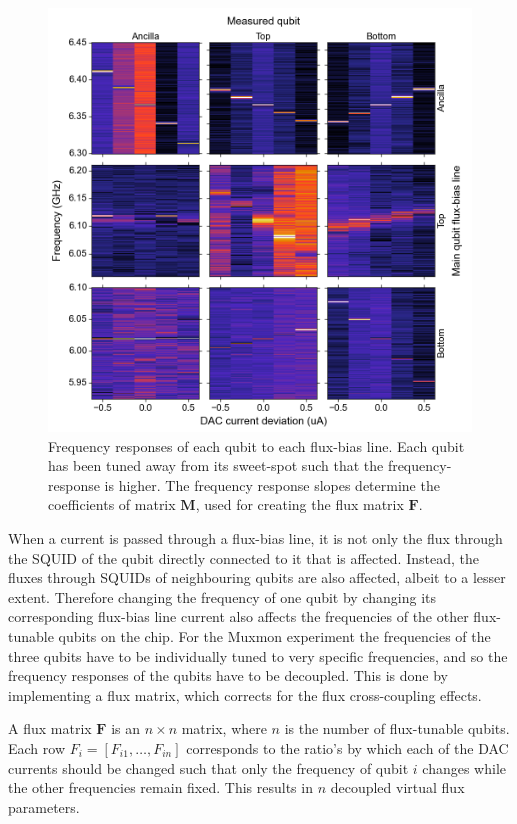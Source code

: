         \begin{figure}[tb]
          \centering
          \includegraphics[width=\textwidth]{../Figures/Qubit characterization/Flux_matrix.png}
          \caption{Frequency responses of each qubit to each flux-bias line. Each qubit has been tuned away from its sweet-spot such that the frequency-response is higher. The frequency response slopes determine the coefficients of matrix $\boldsymbol{M}$, used for creating the flux matrix $\boldsymbol{F}$.}
          \label{fig:flux matrix}
        \end{figure}
        When a current is passed through a flux-bias line, it is not only the flux through the SQUID of the qubit directly connected to it that is affected. Instead, the fluxes through SQUIDs of neighbouring qubits are also affected, albeit to a lesser extent. Therefore changing the frequency of one qubit by changing its corresponding flux-bias line current also affects the frequencies of the other flux-tunable qubits on the chip. For the Muxmon experiment the frequencies of the three qubits have to be individually tuned to very specific frequencies, and so the frequency responses of the qubits have to be decoupled. This is done by implementing a flux matrix, which corrects for the flux cross-coupling effects.

        A flux matrix $\boldsymbol{F}$ is an $n \times n$ matrix, where $n$ is the number of flux-tunable qubits. Each row $F_i = \left[F_{i1}, \dots, F_{in}\right]$ corresponds to the ratio's by which each of the DAC currents should be changed such that only the frequency of qubit $i$ changes while the other frequencies remain fixed. This results in $n$ decoupled virtual flux parameters.

